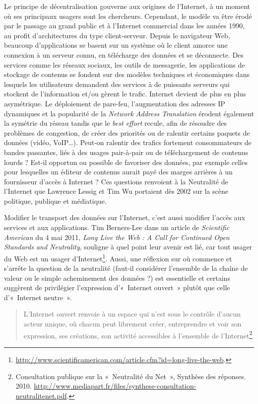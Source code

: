 \documentclass{FramateX}
\begin{document}
\begin{refsection}
Le principe de décentralisation gouverne aux origines de
l'Internet, à un moment où ses principaux usagers sont
les chercheurs. Cependant, le modèle va être érodé par le passage au
grand public et à l'Internet commercial dans les
années 1990, au profit d'architectures du type
client-serveur. Depuis le navigateur Web, beaucoup
d'applications se basent sur un système où le client
amorce une connexion à un serveur connu, en télécharge des données et
se déconnecte. Des services comme les réseaux sociaux, les outils de
messagerie, les applications de stockage de contenus se fondent sur des
modèles techniques et économiques dans lesquels les utilisateurs
demandent des services à de puissants serveurs qui stockent de
l'information et/ou gèrent le trafic. Internet devient
de plus en plus asymétrique. Le déploiement de pare-feu,
l'augmentation des adresses IP dynamiques et la
popularité de la \textit{Network Address Translation} érodent également
la symétrie du réseau tandis que le \textit{best effort} recule, afin
de résoudre des problèmes de congestion, de créer des priorités ou de
ralentir certains paquets de données (vidéo, VoIP\ldots). Peut-on ralentir
des trafics fortement consommateurs de bandes passantes, liés à des
usages pair-à-pair ou de téléchargement de contenus lourds ? Est-il
opportun ou possible de favoriser des données, par exemple celles pour
lesquelles un éditeur de contenus aurait payé des marges arrières à un
fournisseur d'accès à Internet ? Ces questions
renvoient à la Neutralité de l'Internet que Lawrence
Lessig et Tim Wu portaient dès 2002 sur la scène politique, publique et
médiatique. 

Modifier le transport des données sur l'Internet,
c'est aussi modifier l'accès aux
services et aux applications. Tim Berners-Lee dans un article de
\textit{Scientific American} du 4 mai 2011, \textit{Long Live the Web :
A Call for Continued Open Standards and Neutrality}, souligne à quel
point leur avenir est lié, car tout usager du Web est un usager
d'Internet\footnote{\url{http://www.scientificamerican.com/article.cfm?id=long-live-the-web}.}. 
Aussi, une réflexion sur où commence et s'arrête la
question de la neutralité (faut-il considérer
l'ensemble de la chaîne de valeur ou le simple
acheminement des données ?) est essentielle et certains suggèrent de
privilégier l'expression d'«~Internet
ouvert~» plutôt que celle d'«~Internet neutre~».

\begin{quote}
L'Internet ouvert renvoie à un espace qui
n'est sous le contrôle d'aucun acteur
unique, où chacun peut librement créer, entreprendre et voir son
expression, ses créations, son activité accessibles à
l'ensemble de
l'Internet\footnote{Consultation publique sur la
«~Neutralité du Net~», Synthèse des réponses. 2010. \url{http://www.mediapart.fr/files/synthese-consultation-neutralitenet.pdf}.}
\end{quote}


\end{refsection}
\end{document}
